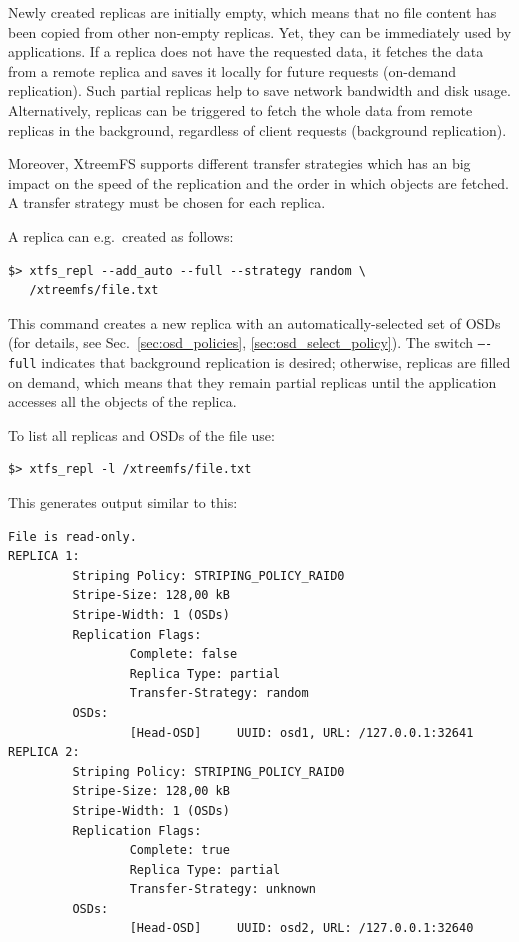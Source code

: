 \documentclass[a4paper,10pt]{book}
\begin{document}
Newly created replicas are initially empty, which means that no file content has been copied from other non-empty replicas. Yet, they can be immediately used by applications. If a replica does not have the requested data, it fetches the data from a remote replica and saves it locally for future requests (on-demand replication). Such partial replicas help to save network bandwidth and disk usage. Alternatively, replicas can be triggered to fetch the whole data from remote replicas in the background, regardless of client requests (background replication).

Moreover, XtreemFS supports different transfer strategies which has an big impact on the speed of the replication and the order in which objects are fetched. A transfer strategy must be chosen for each replica.

A replica can e.g.\ created as follows:

\begin{verbatim}
$> xtfs_repl --add_auto --full --strategy random \
   /xtreemfs/file.txt
\end{verbatim}

This command creates a new replica with an automatically-selected set of OSDs (for details, see Sec.\ \ref{sec:osd_policies}, \ref{sec:osd_select_policy}). The switch \texttt{----full} indicates that background replication is desired; otherwise, replicas are filled on demand, which means that they remain partial replicas until the application accesses all the objects of the replica.

To list all replicas and OSDs of the file use:

\begin{verbatim}
$> xtfs_repl -l /xtreemfs/file.txt
\end{verbatim}

This generates output similar to this:

\begin{verbatim}
File is read-only.
REPLICA 1:
         Striping Policy: STRIPING_POLICY_RAID0
         Stripe-Size: 128,00 kB
         Stripe-Width: 1 (OSDs)
         Replication Flags:
                 Complete: false
                 Replica Type: partial
                 Transfer-Strategy: random
         OSDs:
                 [Head-OSD]     UUID: osd1, URL: /127.0.0.1:32641
REPLICA 2:
         Striping Policy: STRIPING_POLICY_RAID0
         Stripe-Size: 128,00 kB
         Stripe-Width: 1 (OSDs)
         Replication Flags:
                 Complete: true
                 Replica Type: partial
                 Transfer-Strategy: unknown
         OSDs:
                 [Head-OSD]     UUID: osd2, URL: /127.0.0.1:32640
\end{verbatim}
\end{document}
